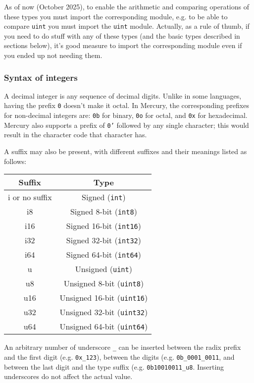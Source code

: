As of now (October 2025), to enable the arithmetic and comparing operations of these types you must import the corresponding module, e.g. to be able to compare \texttt{uint} you must import the \texttt{uint} module. Actually, as a rule of thumb, if you need to do stuff with any of these types (and the basic types described in sections below), it's good measure to import the corresponding module even if you ended up not needing them.

\subsubsection{Syntax of integers}

A decimal integer is any sequence of decimal digits. Unlike in some languages, having the prefix \texttt{0} doesn't make it octal. In Mercury, the corresponding prefixes for non-decimal integers are: \texttt{0b} for binary, \texttt{0o} for octal, and \texttt{0x} for hexadecimal. Mercury also supports a prefix of \texttt{0'} followed by any single character; this would result in the character code that character has.

A suffix may also be present, with different suffixes and their meanings listed as follows:
\begin{center}
  \begin{tabular}{|c|c|}
    \hline
    Suffix & Type \\
    \hline
i or no suffix & Signed (\texttt{int})  \\
i8 & Signed 8-bit (\texttt{int8})  \\
i16 & Signed 16-bit (\texttt{int16})  \\
i32 & Signed 32-bit (\texttt{int32})  \\
i64 & Signed 64-bit (\texttt{int64})  \\
u & Unsigned (\texttt{uint}) \\
u8 & Unsigned 8-bit (\texttt{uint8}) \\
u16 & Unsigned 16-bit (\texttt{uint16}) \\
u32 & Unsigned 32-bit (\texttt{uint32}) \\
u64 & Unsigned 64-bit (\texttt{uint64}) \\
\hline
  \end{tabular}
  \end{center}

An arbitrary number of underscore \texttt{\_} can be inserted between the radix prefix and the first digit (e.g. \texttt{0x\_123}), between the digits (e.g. \texttt{0b\_0001\_0011}, and between the last digit and the type suffix (e.g. \texttt{0b10010011\_u8}. Inserting underscores do not affect the actual value.

